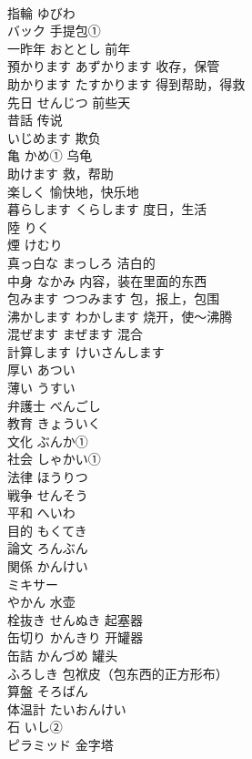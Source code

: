 \documentclass[8pt]{extreport}
\begin{document}
\begin{CJK}{UTF8}{min}
\\	指輪	ゆびわ	
\\	バック	手提包① 
\\	一昨年	おととし 前年	
\\	預かります	あずかります 收存，保管	
\\	助かります	たすかります 得到帮助，得救	
\\	先日	せんじつ 前些天	
\\	昔話	传说	
\\	いじめます	欺负	
\\	亀	かめ① 乌龟	
\\	助けます	救，帮助	
\\	楽しく	愉快地，快乐地	
\\	暮らします	くらします 度日，生活	
\\	陸	りく	
\\	煙	けむり	
\\	真っ白な	まっしろ 洁白的	
\\	中身	なかみ 内容，装在里面的东西	
\\	包みます	つつみます 包，报上，包围	
\\	沸かします	わかします 烧开，使～沸腾	
\\	混ぜます	まぜます 混合	
\\	計算します	けいさんします	
\\	厚い	あつい	
\\	薄い	うすい	
\\	弁護士	べんごし	
\\	教育	きょういく	
\\	文化	ぶんか①	
\\	社会	しゃかい①	
\\	法律	ほうりつ	
\\	戦争	せんそう	
\\	平和	へいわ	
\\	目的	もくてき	
\\	論文	ろんぶん	
\\	関係	かんけい	
\\	ミキサー	
\\	やかん	水壶	
\\	栓抜き	せんぬき 起塞器	
\\	缶切り	かんきり 开罐器	
\\	缶詰	かんづめ 罐头	
\\	ふろしき	包袱皮（包东西的正方形布）	
\\	算盤	そろばん	
\\	体温計	たいおんけい	
\\	石	いし②	
\\	ピラミッド	金字塔	

\end{CJK}
\end{document}
